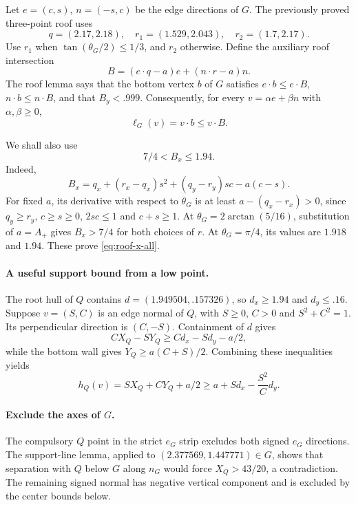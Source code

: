 \documentclass[11pt]{article}
\begin{document}
Let $e=(c,s)$, $n=(-s,c)$ be the edge directions of $G$.
The previously proved three-point roof uses
\[
 q=(2.17,2.18),\quad r_1=(1.529,2.043),\quad r_2=(1.7,2.17).
\]
Use $r_1$ when $\tan(\theta_G/2)\le1/3$, and $r_2$ otherwise.
Define the auxiliary roof intersection
\[
 B=(e\cdot q-a)e+(n\cdot r-a)n.
\]
The roof lemma says that the bottom vertex $b$ of $G$ satisfies
$e\cdot b\le e\cdot B$, $n\cdot b\le n\cdot B$, and that
$B_y<.999$. Consequently, for every $v=\alpha e+\beta n$ with
$\alpha,\beta\ge0$,
\begin{equation}\label{eq:roof-support-all}
 \ell_G(v)=v\cdot b\le v\cdot B.
\end{equation}

We shall also use
\begin{equation}\label{eq:roof-x-all}
 7/4<B_x\le1.94.
\end{equation}
Indeed,
\[
 B_x=q_x+(r_x-q_x)s^2+(q_y-r_y)sc-a(c-s).
\]
For fixed $a$, its derivative with respect to $\theta_G$ is at least
$a-(q_x-r_x)>0$, since $q_y\ge r_y$, $c\ge s\ge0$,
$2sc\le1$ and $c+s\ge1$.
At $\theta_G=2\arctan(5/16)$, substitution of $a=A_+$ gives
$B_x>7/4$ for both choices of $r$.
At $\theta_G=\pi/4$, its values are $1.918$ and $1.94$.
These prove \eqref{eq:roof-x-all}.

\paragraph{A useful support bound from a low point.}
The root hull of $Q$ contains
$d=(1.949504,.157326)$, so $d_x\ge1.94$ and $d_y\le.16$.
Suppose $v=(S,C)$ is an edge normal of $Q$, with $S\ge0$, $C>0$
and $S^2+C^2=1$. Its perpendicular direction is $(C,-S)$.
Containment of $d$ gives
\[
 CX_Q-SY_Q\ge Cd_x-Sd_y-a/2,
\]
while the bottom wall gives $Y_Q\ge a(C+S)/2$.
Combining these inequalities yields
\begin{equation}\label{eq:low-point-support-all}
 h_Q(v)=SX_Q+CY_Q+a/2
 \ge a+Sd_x-\frac{S^2}{C}d_y.
\end{equation}

\paragraph{Exclude the axes of $G$.}
The compulsory $Q$ point in the strict $e_G$ strip excludes both
signed $e_G$ directions. The support-line lemma, applied to
$(2.377569,1.447771)\in G$, shows that separation with $Q$ below
$G$ along $n_G$ would force $X_Q>43/20$, a contradiction.
The remaining signed normal has negative vertical component and is
excluded by the center bounds below.
\end{document}
